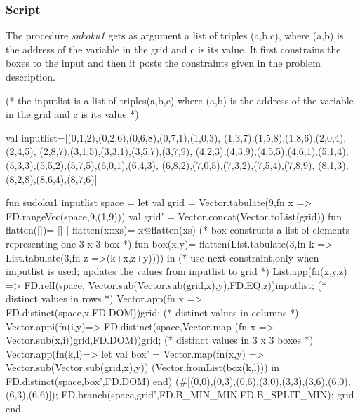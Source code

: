 \documentclass[a4paper,halfparskip]{scrartcl}
\begin{document}
\subsubsection{Script}
The procedure \emph{sukoku1} gets as argument a list of
triples (a,b,c), where (a,b) is the address of the variable 
in the grid and c is its value. It first constrains the
boxes to the input and then it posts the constraints given in
the problem description. 
\begin{myverbatim}
(* the inputlist is a list of triples(a,b,c) where
   (a,b) is the address of the variable in the grid
   and c is its value  *)

val inputlist=[(0,1,2),(0,2,6),(0,6,8),(0,7,1),(1,0,3),
               (1,3,7),(1,5,8),(1,8,6),(2,0,4),(2,4,5),
               (2,8,7),(3,1,5),(3,3,1),(3,5,7),(3,7,9),
               (4,2,3),(4,3,9),(4,5,5),(4,6,1),(5,1,4),
               (5,3,3),(5,5,2),(5,7,5),(6,0,1),(6,4,3),
               (6,8,2),(7,0,5),(7,3,2),(7,5,4),(7,8,9),
               (8,1,3),(8,2,8),(8,6,4),(8,7,6)]

fun sudoku1 inputlist space =
    let
        val grid = Vector.tabulate(9,fn x => 
                           FD.rangeVec(space,9,(1,9)))
        val grid' = Vector.concat(Vector.toList(grid))
        fun flatten([])= []
              | flatten(x::xs)= x@flatten(xs)
        (* box constructs a list of elements representing
           one 3 x 3 box *)
        fun box(x,y)= flatten(List.tabulate(3,fn k => 
                   List.tabulate(3,fn z =>(k+x,z+y))))
    in 
        (* use next constraint,only when imputlist is used;
           updates the values from inputlist to grid *)
        List.app(fn(x,y,z) => FD.relI(space,
            Vector.sub(Vector.sub(grid,x),y),FD.EQ,z))inputlist;
        (* distinct values in rows *)
        Vector.app(fn x => FD.distinct(space,x,FD.DOM))grid;
        (* distinct values in columns *)
        Vector.appi(fn(i,y)=> FD.distinct(space,Vector.map
                     (fn x => Vector.sub(x,i))grid,FD.DOM))grid;
        (* distinct values in 3 x 3 boxes *)
        Vector.app(fn(k,l)=> 
          let
             val box' = Vector.map(fn(x,y) => 
                              Vector.sub(Vector.sub(grid,x),y))
                             (Vector.fromList(box(k,l)))
          in
             FD.distinct(space,box',FD.DOM)
          end)
         (#[(0,0),(0,3),(0,6),(3,0),(3,3),(3,6),(6,0),(6,3),(6,6)]);
        FD.branch(space,grid',FD.B_MIN_MIN,FD.B_SPLIT_MIN);
        grid
    end
\end{myverbatim}
\end{document}
